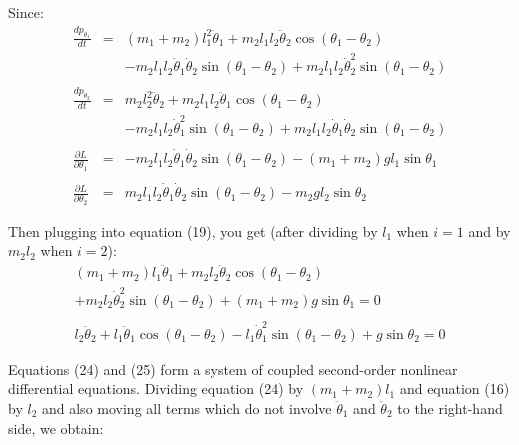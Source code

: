 \documentclass[12pt]{article}
\begin{document}
Since:
\begin{eqnarray}
    \frac{dp_{\theta_1}}{dt} &=& (m_1 + m_2)l_1^2\ddot{\theta}_1 + m_2l_1l_2\ddot{\theta}_2\cos(\theta_1 - \theta_2) \nonumber \\
    & & - m_2l_1l_2\dot{\theta}_1\dot{\theta}_2\sin(\theta_1 - \theta_2) + m_2l_1l_2\dot{\theta}_2^2\sin(\theta_1 - \theta_2) \\
    \nonumber \\
    \frac{dp_{\theta_2}}{dt} &=& m_2l_2^2\ddot{\theta}_2 + m_2l_1l_2\ddot{\theta}_1\cos(\theta_1 - \theta_2) \nonumber \\
    & & - m_2l_1l_2\dot{\theta}_1^2\sin(\theta_1 - \theta_2) + m_2l_1l_2\dot{\theta}_1\dot{\theta}_2\sin(\theta_1 - \theta_2) \\
    \nonumber \\
    \frac{\partial L}{\partial \theta_1} &=& -m_2l_1l_2\dot{\theta}_1\dot{\theta}_2\sin(\theta_1 - \theta_2) - (m_1 + m_2)gl_1\sin\theta_1 \\
    \nonumber \\
    \frac{\partial L}{\partial \theta_2} &=& m_2l_1l_2\dot{\theta}_1\dot{\theta}_2\sin(\theta_1 - \theta_2) - m_2gl_2\sin\theta_2
\end{eqnarray}

Then plugging into equation (19), you get (after dividing by $l_1$ when $i=1$ and by $m_2l_2$ when $i=2$):
\begin{eqnarray}
    (m_1 + m_2)l_1\ddot{\theta}_1 + m_2l_2\ddot{\theta}_2\cos(\theta_1 - \theta_2) \nonumber \\
    + m_2l_2\dot{\theta}_2^2\sin(\theta_1 - \theta_2) + (m_1 + m_2)g\sin\theta_1 = 0 \\
    \nonumber \\
    l_2\ddot{\theta}_2 + l_1\ddot{\theta}_1\cos(\theta_1 - \theta_2) - l_1\dot{\theta}_1^2\sin(\theta_1 - \theta_2) + g\sin\theta_2 = 0
\end{eqnarray}

Equations (24) and (25) form a system of coupled second-order nonlinear differential equations. Dividing equation (24) by $(m_1 + m_2)l_1$ and equation (16) by $l_2$ and also moving all terms which do not involve $\ddot{\theta}_1$ and $\ddot{\theta}_2$ to the right-hand side, we obtain:
\end{document}
